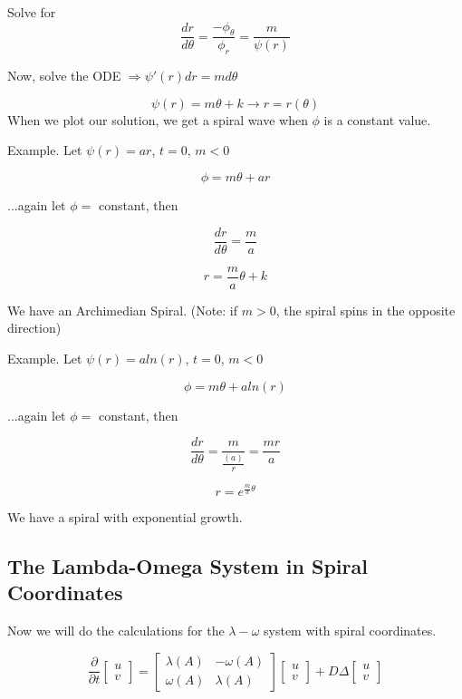 \documentclass[]{article}
\numberwithin{equation}{section}		%
\begin{document}
Solve for \begin{equation}
	\frac{dr}{d\theta}=\frac{-\phi_\theta}{\phi_r}=\frac{m}{\psi(r)}
\end{equation}

Now, solve the ODE $\Rightarrow \psi'(r)dr=md\theta$

\begin{equation}
	\psi(r)=m\theta+k \rightarrow r=r(\theta)
\end{equation}
When we plot our solution, we get a spiral wave when $\phi$ is a constant value.

\noindent Example. Let $\psi(r)=ar$, $t=0$, $m<0$

$$\phi=m\theta+ar$$

...again let $\phi=$ constant, then

$$\frac{dr}{d\theta}=\frac{m}{a}$$

$$r=\frac{m}{a}\theta+k$$

We have an Archimedian Spiral. (Note: if $m>0$, the spiral spins in the opposite direction)

\noindent Example. Let $\psi(r)=aln(r)$, $t=0$, $m<0$

$$\phi=m\theta+aln(r)$$

...again let $\phi=$ constant, then

$$\frac{dr}{d\theta}=\frac{m}{\frac{(a)}{r}}=\frac{mr}{a}$$

$$r=e^{\frac{m}{a}\theta}$$

We have a spiral with exponential growth.

\subsection{The Lambda-Omega System in Spiral Coordinates}

Now we will do the calculations for the $\lambda-\omega$ system with spiral coordinates.

$$\frac{\partial}{\partial t}
\begin{bmatrix}
u \\
v
\end{bmatrix} =
 \begin{bmatrix}
\lambda(A) & -\omega(A) \\
\omega(A) & \lambda(A)
\end{bmatrix}
\begin{bmatrix}
u \\
v
\end{bmatrix} +D\Delta
\begin{bmatrix}
u\\
v
\end{bmatrix}$$
\end{document}
